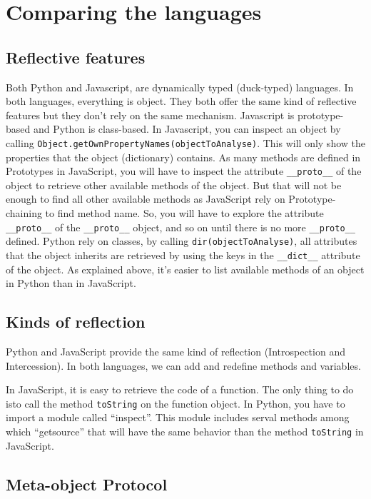 \documentclass[a4paper,10pt]{article}
\begin{document}
\section{Comparing the languages}

\subsection{Reflective features}

Both Python and Javascript, are dynamically typed (duck-typed) languages.
In both languages, everything is object.
They both offer the same kind of reflective features but they don't rely on the same mechanism.
Javascript is prototype-based and Python is class-based.
In Javascript, you can inspect an object by calling \setjs \mbox{\lstinline|Object.getOwnPropertyNames(objectToAnalyse)|}.
This will only show the properties that the object (dictionary) contains.
As many methods are defined in Prototypes in JavaScript, you will have to inspect the attribute \lstinline|__proto__| of the object to retrieve other available methods of the object.
But that will not be enough to find all other available methods as JavaScript rely on Prototype-chaining to find method name.
So, you will have to explore the attribute \lstinline|__proto__| of the \lstinline|__proto__| object, and so on until there is no more \lstinline|__proto__| defined.
\setpy
Python rely on classes, by calling \lstinline|dir(objectToAnalyse)|, all attributes that the object inherits are retrieved by using the keys in the \lstinline|__dict__| attribute of the object. As explained above, it's easier to list available methods of an object in Python than in JavaScript.

\subsection{Kinds of reflection}

Python and JavaScript provide the same kind of reflection (Introspection and Intercession). In both languages, we can add and redefine methods and variables.

In JavaScript, it is easy to retrieve the code of a function. The only thing to do isto call the method \lstinline|toString| on the function object. In Python, you have to import a module called ``inspect''. This module includes serval methods among which ``getsource'' that will have the same behavior than the method \lstinline|toString| in JavaScript.

\subsection{Meta-object Protocol}
\end{document}
